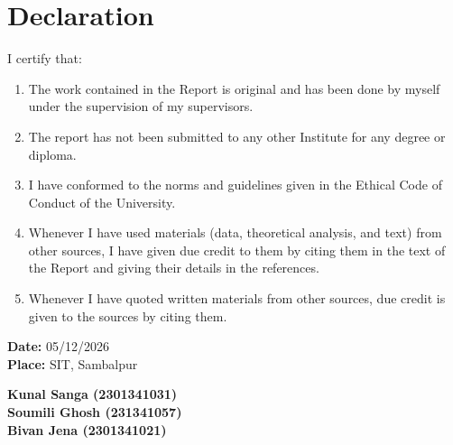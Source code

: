 \documentclass[12pt,a4paper,oneside]{report}
\begin{document}

\clearpage

\chapter*{Declaration}

\justifying

I certify that:

\begin{enumerate}[label=(\alph*)]

    \item The work contained in the Report is original and has been done by myself under the supervision of my supervisors.

    \item The report has not been submitted to any other Institute for any degree or diploma.

    \item I have conformed to the norms and guidelines given in the Ethical Code of Conduct of the University.

    \item Whenever I have used materials (data, theoretical analysis, and text) from other sources, I have given due credit to them by citing them in the text of the Report and giving their details in the references.
    
    \item Whenever I have quoted written materials from other sources, due credit is given to the sources by citing them.

\end{enumerate}

\vspace{0.8cm}

\noindent
\textbf{Date:} 05/12/2026\\
\textbf{Place:} SIT, Sambalpur

\vspace{0.8cm}

\begin{flushright}
\textbf{
Kunal Sanga (2301341031)\\
Soumili Ghosh (231341057)\\
Bivan Jena (2301341021)
}
\end{flushright}

\end{document}
